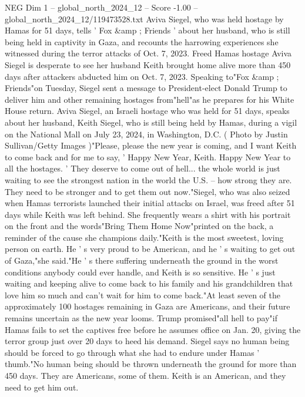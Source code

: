 \begin{textsample}{NEG Dim 1 – global\_north\_2024\_12 – Score -1.00 – global\_north\_2024\_12/119473528.txt}  \label{ex:f1_neg_219}
Aviva Siegel, who was held hostage by Hamas for 51 days, tells ' Fox \&amp ; Friends ' about her husband, who is still being held in captivity in Gaza, and recounts the harrowing experiences she witnessed during the terror attacks of Oct. 7, 2023.
Freed Hamas hostage Aviva Siegel is desperate to see her husband Keith brought home alive more than 450 days after attackers abducted him on Oct. 7, 2023.
Speaking to"Fox \&amp ; Friends"on Tuesday, Siegel sent a message to President-elect Donald Trump to deliver him and other remaining hostages from"hell"as he prepares for his White House return.
Aviva Siegel, an Israeli hostage who was held for 51 days, speaks about her husband, Keith Siegel, who is still being held by Hamas, during a vigil on the National Mall on July 23, 2024, in Washington, D.C. ( Photo by Justin Sullivan/Getty Images )"Please, please the new year is coming, and I want Keith to come back and for me to say, ' Happy New Year, Keith.
Happy New Year to all the hostages. ' They deserve to come out of hell... the whole world is just waiting to see the strongest nation in the world the U.S. -- how strong they are.
They need to be stronger and to get them out now."Siegel, who was also seized when Hamas terrorists launched their initial attacks on Israel, was freed after 51 days while Keith was left behind.
She frequently wears a shirt with his portrait on the front and the words"Bring Them Home Now"printed on the back, a reminder of the cause she champions daily."Keith is the most sweetest, loving person on earth.
He ' s very proud to be American, and he ' s waiting to get out of Gaza,"she said."He ' s there suffering underneath the ground in the worst conditions anybody could ever handle, and Keith is so sensitive.
He ' s just waiting and keeping alive to come back to his family and his grandchildren that love him so much and can't wait for him to come back."At least seven of the approximately 100 hostages remaining in Gaza are Americans, and their future remains uncertain as the new year looms.
Trump promised"all hell to pay"if Hamas fails to set the captives free before he assumes office on Jan. 20, giving the terror group just over 20 days to heed his demand.
Siegel says no human being should be forced to go through what she had to endure under Hamas ' thumb."No human being should be thrown underneath the ground for more than 450 days.
They are Americans, some of them.
Keith is an American, and they need to get him out.

\end{textsample}
